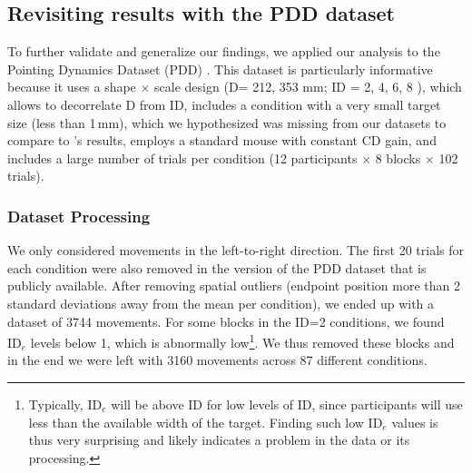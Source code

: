 \documentclass[acmlarge, manuscript,review]{acmart}
\newcommand{\ide}{\ensuremath{{\text{ID}_e}}\xspace}
\newcommand{\D}{\ensuremath{{\text{D}}}\xspace}
\begin{document}
\subsection{Revisiting results with the PDD dataset\label{subs:synthesis:pdd}}
To further validate and generalize our findings, we applied our analysis to the Pointing Dynamics Dataset (PDD) \cite{mueller2017}. This dataset is particularly informative because it uses a shape $\times$ scale design (\D = 212, 353 mm; ID = 2, 4, 6, 8 ), which allows to decorrelate D from ID, includes a condition with a very small target size (less than 1\,mm), which we hypothesized was missing from our datasets to compare to \citeauthor{zhai2004nominal}'s results, employs a standard mouse with constant CD gain, and includes a large number of trials per condition (12 participants $\times$ 8 blocks $\times$ 102 trials).



\subsubsection{Dataset Processing}
We only considered movements in the left-to-right direction. The first 20 trials for each condition were also removed in the version of the PDD dataset that is publicly available. After removing spatial outliers (endpoint position more than 2 standard deviations away from the mean per condition), we ended up with a dataset of 3744 movements. For some blocks in the ID=2 conditions, we found \ide levels below 1, which is abnormally low\footnote{Typically, \ide will be above ID for low levels of ID, since participants will use less than the available width of the target. Finding such low \ide values is thus very surprising and likely indicates a problem in the data or its processing.}. We thus removed these blocks and in the end we were left with 3160 movements across 87 different conditions. 
\end{document}
